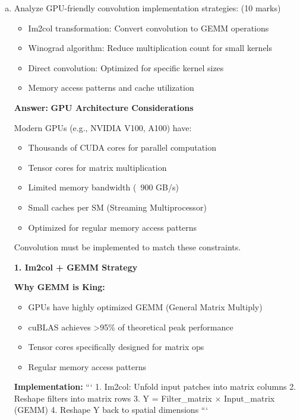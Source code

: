 \documentclass[12pt]{article}
\newcommand{\answer}[1]{{\color{answercolor}\textbf{Answer:} #1}}
\newcommand{\explanation}[1]{{\color{explanationcolor}#1}}
\begin{document}
\begin{enumerate}[(a)]
    \item Analyze GPU-friendly convolution implementation strategies: \hfill (10 marks)
    \begin{itemize}
        \item Im2col transformation: Convert convolution to GEMM operations
        \item Winograd algorithm: Reduce multiplication count for small kernels
        \item Direct convolution: Optimized for specific kernel sizes
        \item Memory access patterns and cache utilization
    \end{itemize}
    
    \answer{
    \textbf{GPU Architecture Considerations}
    
    \explanation{
    Modern GPUs (e.g., NVIDIA V100, A100) have:
    \begin{itemize}
        \item Thousands of CUDA cores for parallel computation
        \item Tensor cores for matrix multiplication
        \item Limited memory bandwidth (~900 GB/s)
        \item Small caches per SM (Streaming Multiprocessor)
        \item Optimized for regular memory access patterns
    \end{itemize}
    
    Convolution must be implemented to match these constraints.
    }
    
    \textbf{1. Im2col + GEMM Strategy}
    
    \explanation{
    \textbf{Why GEMM is King:}
    \begin{itemize}
        \item GPUs have highly optimized GEMM (General Matrix Multiply)
        \item cuBLAS achieves >95\% of theoretical peak performance
        \item Tensor cores specifically designed for matrix ops
        \item Regular memory access patterns
    \end{itemize}
    
    \textbf{Implementation:}
    ```
    1. Im2col: Unfold input patches into matrix columns
    2. Reshape filters into matrix rows  
    3. Y = Filter_matrix × Input_matrix (GEMM)
    4. Reshape Y back to spatial dimensions
    ```
    
}}
\end{enumerate}
\end{document}
